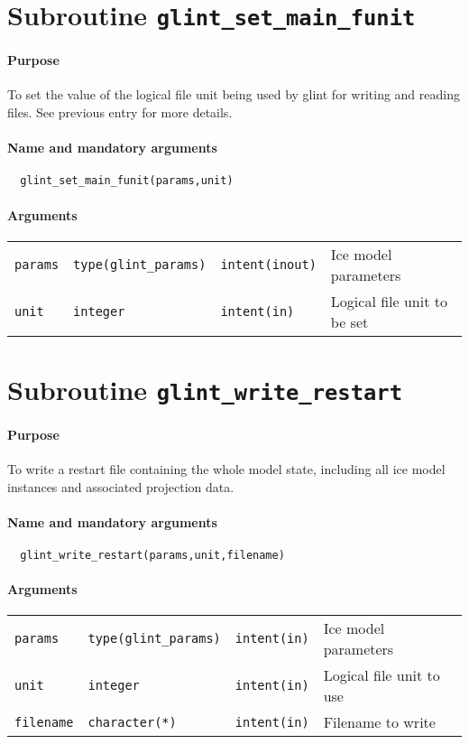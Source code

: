 \section{Subroutine \texttt{glint\_set\_main\_funit}}
%
\paragraph{Purpose}
%
To set the value of the logical file unit being used by glint for writing
and reading files. See previous entry for more details.
%
\paragraph{Name and mandatory arguments}
%
\begin{verbatim}
  glint_set_main_funit(params,unit)
\end{verbatim}
%
\paragraph{Arguments}
%
\begin{center}
\begin{tabular}{llll}
\texttt{params} & \texttt{type(glint\_params)} & \texttt{intent(inout)} &
Ice model parameters \\
\texttt{unit} & \texttt{integer} & \texttt{intent(in)} & Logical file unit to
be set \\
\end{tabular}
\end{center}
%
\section{Subroutine \texttt{glint\_write\_restart}}
%
\paragraph{Purpose}
%
To write a restart file containing the whole model state, including all ice
model instances and associated projection data.
%
\paragraph{Name and mandatory arguments}
%
\begin{verbatim}
  glint_write_restart(params,unit,filename)
\end{verbatim}
%
\paragraph{Arguments}
%
\begin{center}
\begin{tabular}{llll}
\texttt{params} & \texttt{type(glint\_params)} & \texttt{intent(in)} &
Ice model parameters \\
\texttt{unit} & \texttt{integer} & \texttt{intent(in)} & Logical file unit to
use \\
\texttt{filename} & \texttt{character(*)} & \texttt{intent(in)} & Filename to
write \\
\end{tabular}
\end{center}
%
